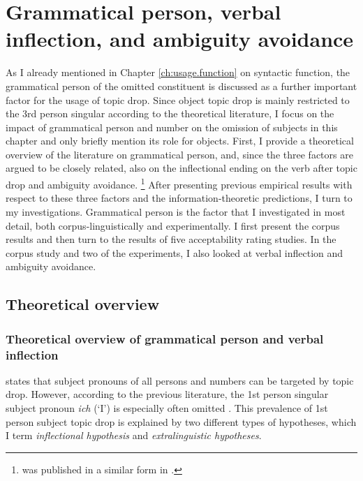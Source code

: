 \chapter{Grammatical person, verbal inflection, and ambiguity avoidance}\label{ch:usage.person}
As I already mentioned in Chapter \ref{ch:usage.function} on syntactic function, the grammatical person of the omitted constituent is discussed as a further important factor for the usage of topic drop.
Since object topic drop is mainly restricted to the 3rd person singular according to the theoretical literature, I focus on the impact of grammatical person and number on the omission of subjects in this chapter and only briefly mention its role for objects.
First, I provide a theoretical overview of the literature on grammatical person, and, since the three factors are argued to be closely related, also on the inflectional ending on the verb after topic drop and ambiguity avoidance.%
\footnote{ was published in a similar form in \citet{schafer2021}.}
After presenting previous empirical results with respect to these three factors and the information-theoretic predictions, I turn to my investigations.
Grammatical person is the factor that I investigated in most detail, both corpus-linguistically and experimentally.
I first present the corpus results and then turn to the results of five acceptability rating studies.
In the corpus study and two of the experiments, I also looked at verbal inflection and ambiguity avoidance.

\section{Theoretical overview}\label{sec:usage.person.theory.general}
\subsection{Theoretical overview of grammatical person and verbal inflection}\label{sec:usage.person.theory}
\citet[272]{volodina2011} states that subject pronouns of all persons and numbers can be targeted by topic drop.
However, according to the previous literature, the 1st person singular subject pronoun \textit{ich} (`I') is especially often omitted \citep{tesak.dittmann1991, auer1993, volodina.onea2012, imo2013, imo2014}.
This prevalence of 1st person subject topic drop is explained by two different types of hypotheses, which I term \textit{inflectional hypothesis} and \textit{extralinguistic hypotheses}.

